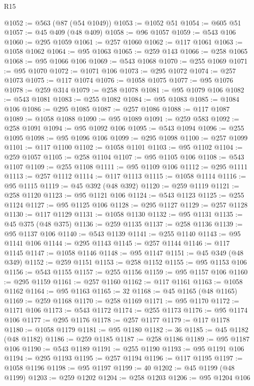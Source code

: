 \begin{lexlean}{R15}
\begin{coremodule}
{{{{{{{{{{{{{{{{{{{{{{{{{{{{{{{{{{{{{{{{{{{{{{{{{{{{{{{{{{{{{{{{{{{{{{@1052 := @563 (@87 (@54 @1049))
@1053 := @1052 @51
@1054 := @605 @51
@1057 := @45 @409 (@48 @409)
@1058 := @96 @1057
@1059 := @543 @106
@1060 := @295 @1059
@1061 := @257 @1060
@1062 := @117 @1061
@1063 := @1058 @1062
@1064 := @95 @1063
@1065 := @259 @143
@1066 := @258 @1065
@1068 := @95 @1066 @106
@1069 := @543 @1068
@1070 := @255 @1069
@1071 := @95 @1070
@1072 := @1071 @106
@1073 := @295 @1072
@1074 := @257 @1073
@1075 := @117 @1074
@1076 := @1058 @1075
@1077 := @95 @1076
@1078 := @259 @314
@1079 := @258 @1078
@1081 := @95 @1079 @106
@1082 := @543 @1081
@1083 := @255 @1082
@1084 := @95 @1083
@1085 := @1084 @106
@1086 := @295 @1085
@1087 := @257 @1086
@1088 := @117 @1087
@1089 := @1058 @1088
@1090 := @95 @1089
@1091 := @259 @583
@1092 := @258 @1091
@1094 := @95 @1092 @106
@1095 := @543 @1094
@1096 := @255 @1095
@1098 := @95 @1096 @106
@1099 := @295 @1098
@1100 := @257 @1099
@1101 := @117 @1100
@1102 := @1058 @1101
@1103 := @95 @1102
@1104 := @259 @1057
@1105 := @258 @1104
@1107 := @95 @1105 @106
@1108 := @543 @1107
@1109 := @255 @1108
@1111 := @95 @1109 @106
@1112 := @295 @1111
@1113 := @257 @1112
@1114 := @117 @1113
@1115 := @1058 @1114
@1116 := @95 @1115
@1119 := @45 @392 (@48 @392)
@1120 := @259 @1119
@1121 := @258 @1120
@1123 := @95 @1121 @106
@1124 := @543 @1123
@1125 := @255 @1124
@1127 := @95 @1125 @106
@1128 := @295 @1127
@1129 := @257 @1128
@1130 := @117 @1129
@1131 := @1058 @1130
@1132 := @95 @1131
@1135 := @45 @375 (@48 @375)
@1136 := @259 @1135
@1137 := @258 @1136
@1139 := @95 @1137 @106
@1140 := @543 @1139
@1141 := @255 @1140
@1143 := @95 @1141 @106
@1144 := @295 @1143
@1145 := @257 @1144
@1146 := @117 @1145
@1147 := @1058 @1146
@1148 := @95 @1147
@1151 := @45 @349 (@48 @349)
@1152 := @259 @1151
@1153 := @258 @1152
@1155 := @95 @1153 @106
@1156 := @543 @1155
@1157 := @255 @1156
@1159 := @95 @1157 @106
@1160 := @295 @1159
@1161 := @257 @1160
@1162 := @117 @1161
@1163 := @1058 @1162
@1164 := @95 @1163
@1165 := 32
@1168 := @45 @1165 (@48 @1165)
@1169 := @259 @1168
@1170 := @258 @1169
@1171 := @95 @1170
@1172 := @1171 @106
@1173 := @543 @1172
@1174 := @255 @1173
@1176 := @95 @1174 @106
@1177 := @295 @1176
@1178 := @257 @1177
@1179 := @117 @1178
@1180 := @1058 @1179
@1181 := @95 @1180
@1182 := 36
@1185 := @45 @1182 (@48 @1182)
@1186 := @259 @1185
@1187 := @258 @1186
@1189 := @95 @1187 @106
@1190 := @543 @1189
@1191 := @255 @1190
@1193 := @95 @1191 @106
@1194 := @295 @1193
@1195 := @257 @1194
@1196 := @117 @1195
@1197 := @1058 @1196
@1198 := @95 @1197
@1199 := 40
@1202 := @45 @1199 (@48 @1199)
@1203 := @259 @1202
@1204 := @258 @1203
@1206 := @95 @1204 @106
}}}}}}}}}}}}}}}}}}}}}}}}}}}}}}}}}}}}}}}}}}}}}}}}}}}}}}}}}}}}}}}}}}}}}}
\end{coremodule}
\end{lexlean}
